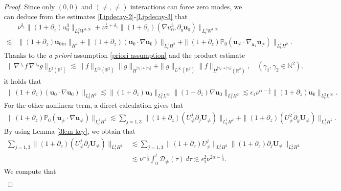 \documentclass[11pt,reqno]{article}
\numberwithin{equation}{section}
\newcommand\R{{\mathbb R}}
\newcommand\PP{{\mathbb P}}
\newcommand\D{{\mathcal D}}
\newcommand\x{\bm{x}}
\newcommand\uu{\bm{u}}
\newcommand\U{\bm{U}}
\let\pa=\partial
\let\al=\alpha
\let\f=\frac
\let\ep=\epsilon
\begin{document}
\begin{proof}
  Since only $(0,0)$ and $(\not=,\not=)$ interactions can force zero modes, 
  we can deduce from the %
    estimates \eqref{Lipdecay-2}-\eqref{Lipdecay-3} that
\begin{align}\label{est-u3-1}
	&\nu^{\delta_1}\|(1+\pa_z)u_0^3\|_{L^2_t W^{1,\infty}}
	+\nu^{\f12+\delta_1}
    \|(1+\pa_z)(\nabla u_0^3,\pa_y \uu_0)\|_{L^1_t W^{1,\infty}}
	\nonumber
	\\
	\lesssim &
	\|(1+\pa_z)\uu_{0in}\|_{H^{2}}
    +\|(1+\pa_z)(\uu_0\cdot\nabla\uu_0)\|_{L^1_tH^{2}}
    +\|(1+\pa_z)\PP_0(\uu_{\not=}\cdot\nabla_{\x_1}\uu_{\not=})\|_{L^1_tH^{2}}.
\end{align}
Thanks to the
\textit{a priori} assumption \eqref{priori assumption} and the product estimate
\begin{align*}
   \| \nabla^{\gamma_1}f\,\nabla^{\gamma_2}g\|_{L^2(\R^2)}\lesssim \|f\|_{L^{\infty}(\R^2)}\|g\|_{\dot{H}^{|\gamma_1|+|\gamma_2|}}%
   +\|g\|_{L^{\infty}(\R^2)}\|f\|_{\dot{H}^{|\gamma_1|+|\gamma_2|}(\R^2)}, \quad (\gamma_1,\gamma_2\in \mathbb{N}^2),
\end{align*}
 it holds that
\begin{align}\label{est-non0-1}
    \|(1+\pa_z)(\uu_0\cdot\nabla\uu_0)\|_{L^1_tH^{2}}
    \lesssim \|(1+\pa_z)\uu_0\|_{L^2_tL^{\infty}}
     \|(1+\pa_z)\nabla\uu_0\|_{L^2_tH^{2}}
    \lesssim \ep_1\nu^{\alpha-\f12} \|(1+\pa_z)\uu_0\|_{L^2_tL^{\infty}}.
\end{align}
For the other nonlinear term, a direct calculation gives that
\begin{align}\label{est-nonq-1}
    \|(1+\pa_z)\PP_0(\uu_{\not=}\cdot\nabla\uu_{\not=})\|_{L^1_tH^{2}}
    \lesssim 
    \sum_{j=1,3}\|(1+\pa_z)(U_{\not=}^j\pa_j\U_{\not=})\|_{L^1_tH^{2}}
    +\|(1+\pa_z)(U_{\not=}^2\tilde{\pa}_y\U_{\not=})\|_{L^1_tH^{2}}.
\end{align}
By using Lemma \ref{3lem-key}, we obtain that
\begin{align}\label{est-nonq-2}
    \sum_{j=1,3}\|(1+\pa_z)(U_{\not=}^j\pa_j\U_{\not=})\|_{L^1_tH^{2}}
    &\lesssim 
    \sum_{j=1,3}\|(1+\pa_z)U_{\not=}^j\|_{L^2_tH^{2}}
    \|(1+\pa_z)\pa_j\U_{\not=}\|_{L^2_tH^{2}}
    \nonumber
    \\
    &\lesssim 
    \nu^{-\f13} \int_0^t\D_{\not=}(\tau)\,d\tau
	\lesssim  \ep_1^2\nu^{2\al-\f13}.
\end{align}
We compute that
\begin{align}\label{est-U2-1}

\end{align}
\end{proof}
\end{document}
